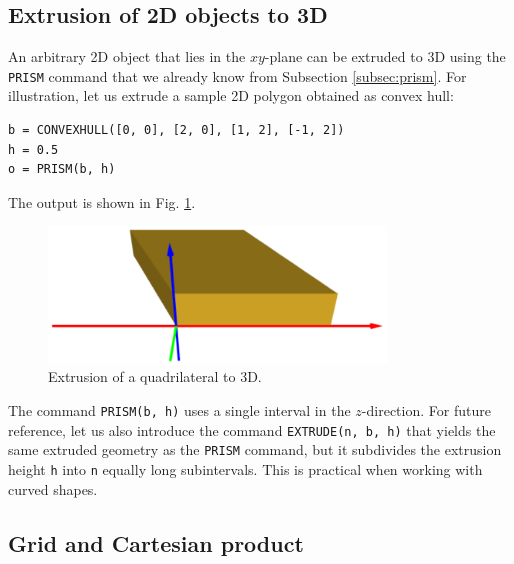 \subsection{Extrusion of 2D objects to 3D}\label{subsec:extrusion}

An arbitrary 2D object that lies in the $xy$-plane can be extruded to 3D
using the {\tt PRISM} command that we already know from Subsection \ref{subsec:prism}. 
For illustration, let us extrude a sample 2D polygon obtained as convex hull:\\

\begin{bbox}
\begin{verbatim}
b = CONVEXHULL([0, 0], [2, 0], [1, 2], [-1, 2])
h = 0.5
o = PRISM(b, h)
\end{verbatim}
\end{bbox}
\vspace{6mm}

\noindent
The output is shown in Fig. \ref{fig:extrusion-3}.\\

\begin{figure}[!ht]
\begin{center}
\includegraphics[width=0.8\textwidth]{img/extrude-3.png}
\end{center}
\vspace{-4mm}
\caption{Extrusion of a quadrilateral to 3D.}
\label{fig:extrusion-3}
\end{figure}
\noindent
The command {\tt PRISM(b, h)} uses a single interval in the $z$-direction. For future
reference, let us also introduce the command {\tt EXTRUDE(n, b, h)} that yields the same
extruded geometry as the {\tt PRISM} command, but it subdivides the extrusion height {\tt h}
into {\tt n} equally long subintervals. This is practical when working with curved 
shapes.

\subsection{Grid and Cartesian product}\label{subsec:grids}

